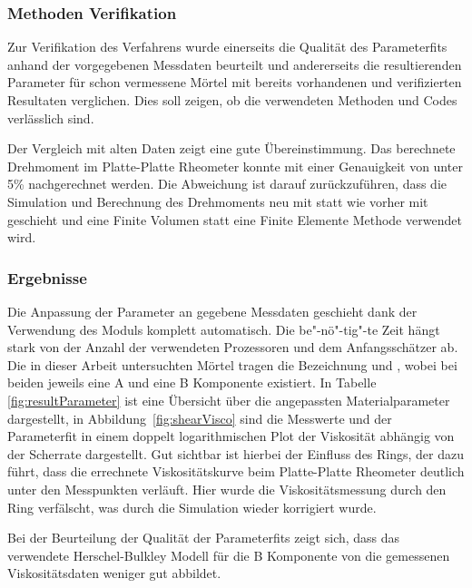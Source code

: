 \subsubsection{Methoden Verifikation}
Zur Verifikation des Verfahrens wurde einerseits die Qualität des Parameterfits anhand der vorgegebenen Messdaten beurteilt und andererseits die resultierenden Parameter für schon vermessene Mörtel mit bereits vorhandenen und verifizierten Resultaten verglichen.
Dies soll zeigen, ob die verwendeten Methoden und Codes verlässlich sind.

Der Vergleich mit alten Daten zeigt eine gute Übereinstimmung. Das berechnete Drehmoment im Platte-Platte Rheometer konnte mit einer Genauigkeit von unter 5\% nachgerechnet werden. Die Abweichung ist darauf zurückzuführen, dass die Simulation und Berechnung des Drehmoments neu mit \openfoam{} statt wie vorher mit \comsol{} geschieht und eine Finite Volumen statt eine Finite Elemente Methode verwendet wird.
%
\subsubsection{Ergebnisse}
Die Anpassung der Parameter an gegebene Messdaten geschieht dank der Verwendung des  Moduls komplett automatisch. 
Die be"-nö"-tig"-te Zeit hängt stark von der Anzahl der verwendeten Prozessoren und dem Anfangsschätzer ab.
%
Die in dieser Arbeit untersuchten Mörtel tragen die Bezeichnung \moertelA{} und \moertelB{}, wobei bei beiden jeweils eine A und eine B Komponente exis\-tiert. %
In Tabelle \ref{fig:resultParameter} ist eine Übersicht über die angepassten Materialparameter dargestellt, in Abbildung~\ref{fig:shearVisco} sind die Messwerte und der Parameterfit in einem doppelt logarithmischen Plot der Viskosität abhängig von der Scherrate dargestellt.
Gut sichtbar ist hierbei der Einfluss des Rings, der dazu führt, dass die errechnete Viskositätskurve beim Platte-Platte Rheometer deutlich unter den Messpunkten verläuft.\linebreak
Hier wurde die Viskositätsmessung durch den Ring verfälscht, was durch die Simulation wieder korrigiert wurde.

Bei der Beurteilung der Qualität der Parameterfits zeigt sich, dass das verwendete Herschel-Bulkley Modell für die B Komponente von \moertelA{} die gemessenen Viskositätsdaten weniger gut abbildet.

